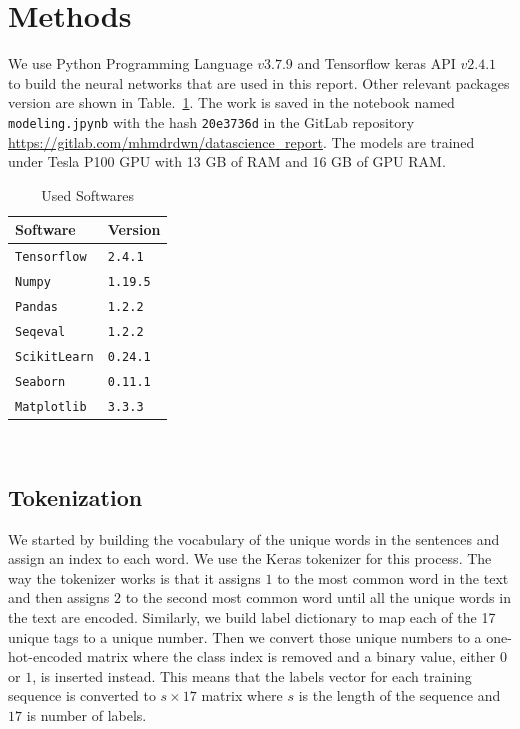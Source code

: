 \documentclass[sigconf, nonacm, natbib, screen, balance=False]{acmart}
\begin{document}
\section{Methods}\label{sec:methods}
We use Python Programming Language $v3.7.9$ and Tensorflow keras API $v2.4.1$ to build the neural networks that are used in this report. Other relevant packages version are shown in Table.~\ref{tbl:packages}. The work is saved in the notebook named \verb!modeling.jpynb! with the hash \verb!20e3736d! in the GitLab repository  \url{https://gitlab.com/mhmdrdwn/datascience_report}. The models are trained under  Tesla P100 GPU with 13 GB of RAM and 16 GB of GPU RAM. 
\hfill\\
\begin{table}
  \caption{Used Softwares}
  \label{tbl:packages}
  \begin{tabular}{l|l}  
    \hline
    Software & Version \\\hline
    \verb!Tensorflow! & \verb!2.4.1! \\
    \verb!Numpy! & \verb!1.19.5! \\
    \verb!Pandas! & \verb!1.2.2! \\
    \verb!Seqeval! & \verb!1.2.2! \\
    \verb!ScikitLearn! & \verb!0.24.1! \\
    \verb!Seaborn! & \verb!0.11.1! \\
    \verb!Matplotlib! & \verb!3.3.3! \\\hline
  \end{tabular}
\end{table}
\hfill\\
\subsection{Tokenization}
We started by building the vocabulary of the unique words in the sentences and assign an index to each word. We use the Keras tokenizer for this process. The way the tokenizer works is that it assigns $1$ to the most common word in the text and then assigns $2$ to the second most common word until all the unique words in the text are encoded. Similarly, we build label dictionary to map each of the 17 unique tags to a unique number. Then we convert those unique numbers to a one-hot-encoded matrix where the class index is removed and a binary value, either $0$ or $1$, is inserted instead. This means that the labels vector for each training sequence is converted to $s \times 17$ matrix where $s$ is the length of the sequence and $17$ is number of labels.
\hfill\\
\end{document}
